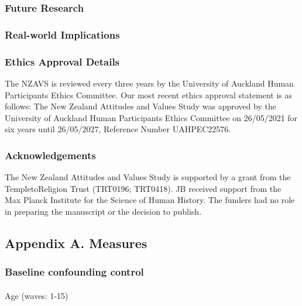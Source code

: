 \documentclass[
  singlecolumn,
  9pt]{scrartcl}
\makeatletter
\let\oldparagraph\paragraph
\renewcommand{\paragraph}{
    \@ifstar
      \xxxParagraphStar
      \xxxParagraphNoStar
  }
\newcommand{\xxxParagraphStar}[1]{\oldparagraph*{#1}\mbox{}}
\newcommand{\xxxParagraphNoStar}[1]{\oldparagraph{#1}\mbox{}}
\makeatother
\begin{document}
\subsubsection{Future Research}\label{future-research}

\subsubsection{Real-world Implications}\label{real-world-implications}

\subsubsection{Ethics Approval Details}\label{ethics-approval-details}

The NZAVS is reviewed every three years by the University of Auckland
Human Participants Ethics Committee. Our most recent ethics approval
statement is as follows: The New Zealand Attitudes and Values Study was
approved by the University of Auckland Human Participants Ethics
Committee on 26/05/2021 for six years until 26/05/2027, Reference Number
UAHPEC22576.

\subsubsection{Acknowledgements}\label{acknowledgements}

The New Zealand Attitudes and Values Study is supported by a grant from
the TempletoReligion Trust (TRT0196; TRT0418). JB received support from
the Max Planck Institute for the Science of Human History. The funders
had no role in preparing the manuscript or the decision to publish.

\newpage{}

\subsection{Appendix A. Measures}\label{appendix-a.-measures}

\subsubsection{Baseline confounding
control}\label{baseline-confounding-control}

\paragraph{Age (waves: 1-15)}\label{age-waves-1-15}
\end{document}

